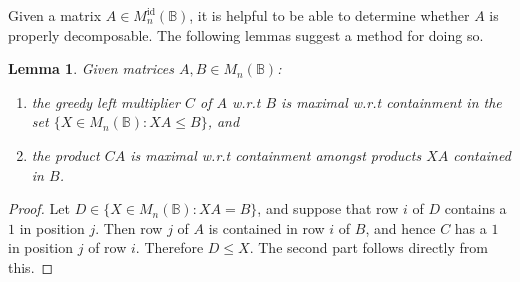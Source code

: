 \documentclass[11pt]{article}
\newtheorem{lemma}[thm]{Lemma}
\numberwithin{equation}{section}
\newcommand{\set}[2]{\ensuremath{\{#1 : #2 \}}}
\newcommand{\B}{\mathbb{B}}
\newcommand{\Bn}{M_n(\B)}
\newcommand{\Refn}{M_n^{\text{id}}(\B)}
\begin{document}
Given a matrix $A \in \Refn$, it is helpful to be able to determine whether $A$
is properly decomposable. The following lemmas suggest a method for doing so.

\begin{lemma}
  Given matrices $A, B \in \Bn$:
  \begin{enumerate}
    \item
      the greedy left multiplier $C$ of $A$ w.r.t $B$ is maximal w.r.t
      containment in the set $\set{X \in \Bn}{XA \leq B}$, and\\
    \item 
      the product $CA$ is maximal w.r.t containment amongst products $XA$
      contained in $B$.
  \end{enumerate}
\end{lemma}
\begin{proof}
  Let $D \in \set{X \in \Bn}{XA = B}$, and suppose that row $i$ of $D$ contains
  a $1$ in position $j$. Then row $j$ of $A$ is contained in row $i$ of $B$, and
  hence $C$ has a $1$ in position $j$ of row $i$. Therefore $D \leq X$. The
  second part follows directly from this.
\end{proof}
\end{document}
